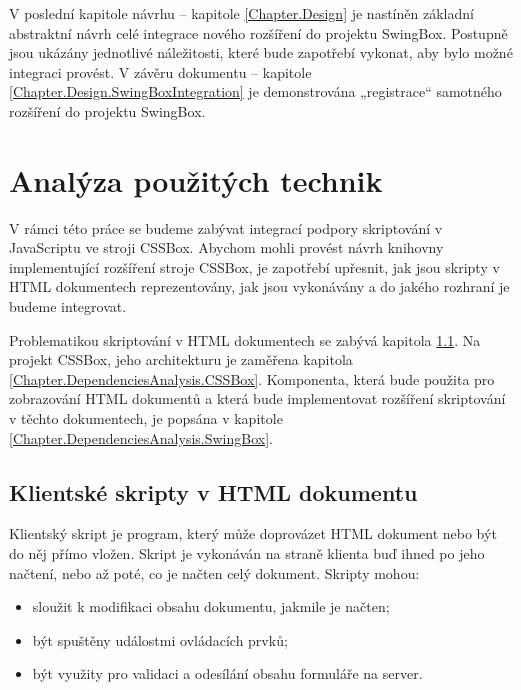 V poslední kapitole návrhu -- kapitole \ref{Chapter.Design} je nastíněn základní abstraktní návrh celé integrace nového rozšíření do projektu SwingBox. Postupně jsou ukázány jednotlivé náležitosti, které bude zapotřebí vykonat, aby bylo možné integraci provést. V závěru \linebreak[4]dokumentu -- kapitole \ref{Chapter.Design.SwingBoxIntegration} je demonstrována „registrace“ samotného rozšíření do projektu SwingBox.


\chapter{Analýza použitých technik}
\label{Chapter.DependenciesAnalysis}

V rámci této práce se budeme zabývat integrací podpory skriptování v JavaScriptu ve stroji CSSBox. Abychom mohli provést návrh knihovny implementující rozšíření stroje CSSBox, je zapotřebí upřesnit, jak jsou skripty v HTML dokumentech reprezentovány, jak jsou vykonávány a do jakého rozhraní je budeme integrovat.

Problematikou skriptování v HTML dokumentech se zabývá kapitola \ref{Chapter.DependenciesAnalysis.ScriptsInHTML}. Na projekt CSSBox, jeho architekturu je zaměřena kapitola \ref{Chapter.DependenciesAnalysis.CSSBox}. Komponenta, která bude použita pro zobrazování HTML dokumentů a která bude implementovat rozšíření skriptování v těchto dokumentech, je popsána v kapitole \ref{Chapter.DependenciesAnalysis.SwingBox}. 

\section{Klientské skripty v HTML dokumentu}
\label{Chapter.DependenciesAnalysis.ScriptsInHTML}

Klientský skript je program, který může doprovázet HTML dokument nebo být do něj přímo vložen. Skript je vykonáván na straně klienta buď ihned po jeho načtení, nebo až poté, co je načten celý dokument. Skripty mohou:

\begin{itemize}
  \item sloužit k modifikaci obsahu dokumentu, jakmile je načten;
  \item být spuštěny událostmi ovládacích prvků;
  \item být využity pro validaci a odesílání obsahu formuláře na server.
\end{itemize}

